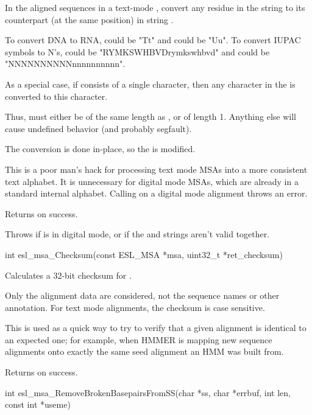 \begin{sreapi}
In the aligned sequences in a text-mode , convert any
residue in the string  to its counterpart (at the same
position) in string .

To convert DNA to RNA,  could be "Tt" and
 could be "Uu". To convert IUPAC symbols to
N's,  could be "RYMKSWHBVDrymkswhbvd" and
 could be "NNNNNNNNNNnnnnnnnnnn". 

As a special case, if  consists of a single
character, then any character in the  is 
converted to this character. 

Thus,  must either be of the same length as
, or of length 1. Anything else will cause
undefined behavior (and probably segfault). 

The conversion is done in-place, so the  is
modified.

This is a poor man's hack for processing text mode MSAs
into a more consistent text alphabet. It is unnecessary
for digital mode MSAs, which are already in a standard
internal alphabet. Calling  on a
digital mode alignment throws an  error.

Returns  on success.

Throws  if  is in digital mode, or if the 
and  strings aren't valid together.


\hypertarget{func:esl_msa_Checksum()}
{\item[int esl\_msa\_Checksum(const ESL\_MSA *msa, uint32\_t *ret\_checksum)]}

Calculates a 32-bit checksum for .

Only the alignment data are considered, not the sequence
names or other annotation. For text mode alignments, the
checksum is case sensitive.

This is used as a quick way to try to verify that a
given alignment is identical to an expected one; for
example, when HMMER is mapping new sequence alignments
onto exactly the same seed alignment an HMM was built
from.

Returns  on success.



\hypertarget{func:esl_msa_RemoveBrokenBasepairsFromSS()}
{\item[int esl\_msa\_RemoveBrokenBasepairsFromSS(char *ss, char *errbuf, int len, const int *useme)]}


\end{sreapi}
